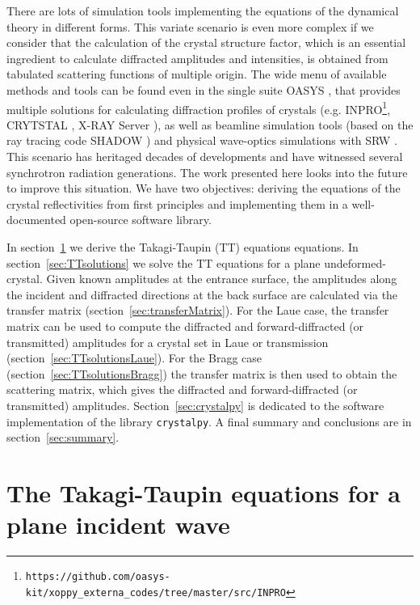 \documentclass[preprint]{iucr}              %
\newcommand{\inblue}[1]{{\color{blue}#1}}
\begin{document}
There are lots of simulation tools implementing the equations of the dynamical theory in different forms. This variate scenario is even more complex if we consider that the calculation of the crystal structure factor, which is an essential ingredient to calculate diffracted amplitudes and intensities, is obtained from tabulated scattering functions of multiple origin. The wide menu of available methods and tools can be found even in the single suite OASYS \cite{codeOASYS}, that provides multiple solutions for calculating diffraction profiles of crystals (e.g. INPRO\footnote{\texttt{https://github.com/oasys-kit/xoppy\_externa\_codes/tree/master/src/INPRO}}, CRYTSTAL \cite{codeCRYSTAL}, X-RAY Server \cite{codeXRAYserver}), as well as beamline simulation tools (based on the ray tracing code SHADOW \cite{codeSHADOW}) and physical wave-optics simulations with SRW \cite{codeSRW, codeSRWcrystals}. This scenario has heritaged decades of developments and have witnessed several synchrotron radiation generations. The work presented here looks into the future to improve this situation. We have two objectives: deriving the equations of the crystal reflectivities from first principles and implementing them in a well-documented open-source software library.

In section~\ref{sec:TT} we derive the Takagi-Taupin (TT) equations \cite{Takagi1962, Taupin, Taupin1967} equations.
In section~\ref{sec:TTsolutions} we solve the TT equations for a plane undeformed-crystal.
\inblue{Given known amplitudes at the entrance surface,
the amplitudes along the incident and diffracted directions at the back surface are calculated via the transfer matrix (section~\ref{sec:transferMatrix}). For the Laue case, the transfer matrix can be used to compute the diffracted and forward-diffracted (or transmitted) amplitudes for a crystal set in Laue or transmission (section~\ref{sec:TTsolutionsLaue}). For the Bragg case (section~\ref{sec:TTsolutionsBragg}) the transfer matrix is then used to obtain the scattering matrix, which gives the diffracted and forward-diffracted (or transmitted) amplitudes. 
Section~\ref{sec:crystalpy} is dedicated to the software implementation of the library \texttt{crystalpy}. A final summary and conclusions are in section~\ref{sec:summary}.
}

 
 
%
\section{The Takagi-Taupin equations for a plane incident wave}
\label{sec:TT}
\end{document}
